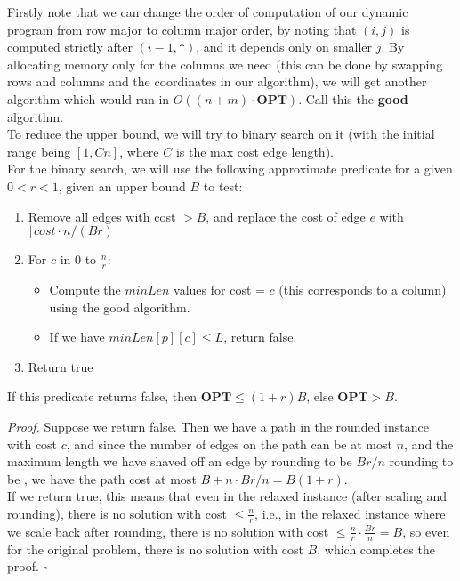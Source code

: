 \documentclass[a4paper]{article}
\newenvironment{proof}{\begin{breakbox}\textit{Proof.}}{\hfill$\square$\end{breakbox}}
\newcommand{\nl}{\vspace{0.2cm}\\}
\newcommand{\OPT}{\mathbf{OPT}}
\begin{document}
Firstly note that we can change the order of computation of our dynamic program from row major to column major order, by noting that $(i, j)$ is computed strictly after $(i - 1, *)$, and it
depends only on smaller $j$. By allocating memory only for the columns we need (this can be done by swapping rows and columns and the coordinates in our algorithm), we will get another algorithm
which would run in $O((n + m) \cdot \OPT)$. Call this the \textbf{good} algorithm.\nl

To reduce the upper bound, we will try to binary search on it (with the initial range being $[1, Cn]$, where $C$ is the max cost edge length).\nl

For the binary search, we will use the following approximate predicate for a given $0 < r < 1$, given an upper bound $B$ to test:

\begin{enumerate}
    \item Remove all edges with cost $> B$, and replace the cost of edge $e$ with $\lfloor cost \cdot n / (B r) \rfloor$
    \item For $c$ in $0$ to $\frac{n}{r}$:
        \begin{itemize}
            \item Compute the $minLen$ values for cost = $c$ (this corresponds to a column) using the good algorithm.
            \item If we have $minLen[p][c] \le L$, return false.
        \end{itemize}
    \item Return true
\end{enumerate}

\begin{claim}
    If this predicate returns false, then $\OPT \le (1 + r) B$, else $\OPT > B$.
\end{claim}
\begin{proof}
    Suppose we return false. Then we have a path in the rounded instance with cost $c$, and since the number of edges on the path can be at most $n$, and the maximum length we have shaved off an edge by
    rounding to be $Br/n$
    rounding to be , we have the path cost at most $B + n \cdot Br / n = B(1 + r)$.\nl
    If we return true, this means that even in the relaxed instance (after scaling and rounding), there is no solution with cost $\le \frac{n}{r}$, i.e., in the relaxed instance where we scale back after
    rounding, there is no solution with cost $\le \frac{n}{r} \cdot \frac{Br}{n} = B$, so even for the original problem, there is no solution with cost $B$, which completes the proof.
\end{proof}
\end{document}

